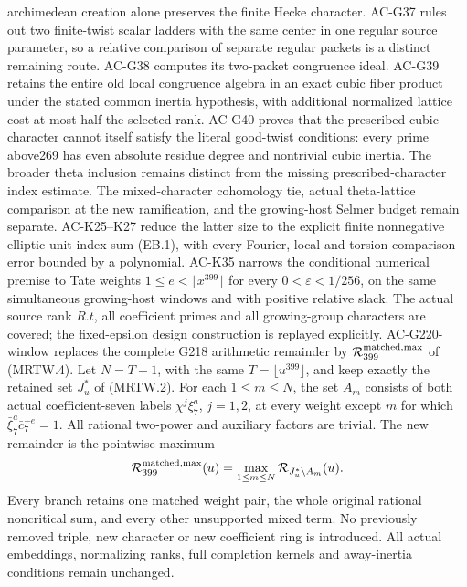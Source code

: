 \documentclass[11pt,a4paper]{article}
\theoremstyle{definition}
\theoremstyle{remark}
\begin{document}
archimedean creation alone preserves the finite Hecke character.
AC-G37 rules out two finite-twist scalar ladders with the same
center in one regular source parameter, so a relative comparison
of separate regular packets is a distinct remaining route.
AC-G38 computes its two-packet congruence ideal. AC-G39 retains
the entire old local congruence algebra in an exact cubic
fiber product under the stated common inertia hypothesis,
with additional normalized lattice cost at most half the selected rank.
AC-G40 proves that the prescribed cubic character cannot itself
satisfy the literal good-twist conditions: every prime above269
has even absolute residue degree and nontrivial cubic inertia.
The broader theta inclusion remains distinct from the missing
prescribed-character index estimate.
The mixed-character
cohomology tie, actual theta-lattice comparison at the new ramification,
and the growing-host Selmer budget remain separate.
AC-K25--K27 reduce the latter size to the explicit finite
nonnegative elliptic-unit index sum (EB.1), with every Fourier,
local and torsion comparison error bounded by a polynomial.
AC-K35 narrows the conditional numerical premise to Tate weights
$1\leq e<\lfloor x^{399}\rfloor$ for every
$0<\varepsilon<1/256$, on the same simultaneous growing-host
windows and with positive relative slack. The actual source rank
$R.t$, all coefficient primes and all growing-group characters are
covered; the fixed-epsilon design construction is replayed explicitly.
AC-G220-window replaces the complete G218 arithmetic remainder by
$\mathcal R_{399}^{\rm matched,max}$ of (MRTW.4).
Let $N=T-1$, with the same $T=\lfloor u^{399}\rfloor$, and keep
exactly the retained set $J_u^*$ of (MRTW.2).
For each $1\leq m\leq N$, the set $A_m$ consists of both actual
coefficient-seven labels $\chi^j\xi_7^a$, $j=1,2$, at every
weight except $m$ for which $\bar\xi_7^a\bar c_7^{-e}=1$.
All rational two-power and auxiliary factors are trivial.
The new remainder is the pointwise maximum
\[
 \mathcal R_{399}^{\rm matched,max}(u)
   =\max_{1\leq m\leq N}\mathcal R_{J_u^*\setminus A_m}(u).
\]
Every branch retains one matched weight pair, the whole original
rational noncritical sum, and every other unsupported mixed term.
No previously removed triple, new character or new coefficient ring
is introduced. All actual embeddings, normalizing ranks, full
completion kernels and away-inertia conditions remain unchanged.
\end{document}
